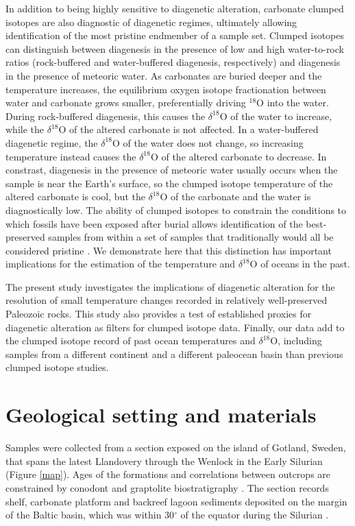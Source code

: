 \documentclass{article}
\newcommand{\deltao}{$\delta^{18}$}
\begin{document}
In addition to being highly sensitive to diagenetic alteration, carbonate clumped isotopes are also diagnostic of diagenetic regimes, ultimately allowing identification of the most pristine endmember of a sample set. Clumped isotopes can distinguish between diagenesis in the presence of low and high water-to-rock ratios (rock-buffered and water-buffered diagenesis, respectively) and diagenesis in the presence of meteoric water. As carbonates are buried deeper and the temperature increases, the equilibrium oxygen isotope fractionation between water and carbonate grows smaller, preferentially driving $^{18}$O into the water. During rock-buffered diagenesis, this causes the \deltao O of the water to increase, while the \deltao O of the altered carbonate is not affected. In a water-buffered diagenetic regime, the \deltao O of the water does not change, so increasing temperature instead causes the \deltao O of the altered carbonate to decrease. In constrast, diagenesis in the presence of meteoric water usually occurs when the sample is near the Earth's surface, so the clumped isotope temperature of the altered carbonate is cool, but the \deltao O of the carbonate and the water is diagnostically low. The ability of clumped isotopes to constrain the conditions to which fossils have been exposed after burial allows identification of the best-preserved samples from within a set of samples that traditionally would all be considered pristine \citep{Eiler2011}. We demonstrate here that this distinction has important implications for the estimation of the temperature and \deltao O of oceans in the past.  

The present study investigates the implications of diagenetic alteration for the resolution of small temperature changes recorded in relatively well-preserved Paleozoic rocks. This study also provides a test of established proxies for diagenetic alteration as filters for clumped isotope data. Finally, our data add to the clumped isotope record of past ocean temperatures and \deltao O, including samples from a different continent and a different paleocean basin than previous clumped isotope studies. 

\section{Geological setting and materials}

Samples were collected from a section exposed on the island of Gotland, Sweden, that spans the latest Llandovery through the Wenlock in the Early Silurian (Figure \ref{map}). Ages of the formations and correlations between outcrops are constrained by conodont and graptolite biostratigraphy \citep{Jeppsson2006}. The section records shelf, carbonate platform and backreef lagoon sediments deposited on the margin of the Baltic basin, which was within 30$^{\circ}$ of the equator during the Silurian \citep{Torsvik1992}. 
\end{document}
